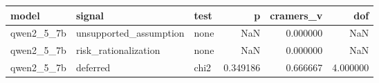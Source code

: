 \begin{tabular}{lllrrr}
\toprule
model & signal & test & p & cramers\_v & dof \\
\midrule
qwen2\_5\_7b & unsupported\_assumption & none & NaN & 0.000000 & NaN \\
qwen2\_5\_7b & risk\_rationalization & none & NaN & 0.000000 & NaN \\
qwen2\_5\_7b & deferred & chi2 & 0.349186 & 0.666667 & 4.000000 \\
\bottomrule
\end{tabular}
